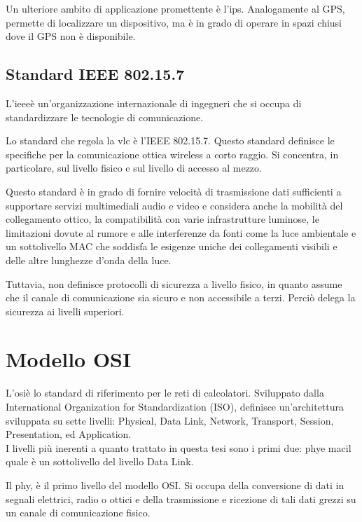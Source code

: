 Un ulteriore ambito di applicazione promettente è l'\gls{ips}\glsfirstoccur. Analogamente al GPS, permette di localizzare un dispositivo, ma è in grado di operare in spazi chiusi dove il GPS non è disponibile.

\subsection{Standard IEEE 802.15.7}
L'\gls{ieee}\glsfirstoccur è un'organizzazione internazionale di ingegneri che si occupa di standardizzare le tecnologie di comunicazione.

Lo standard che regola la \gls{vlc} è l'IEEE 802.15.7. Questo standard definisce le specifiche per la comunicazione ottica wireless a corto raggio. Si concentra, in particolare, sul livello fisico e sul livello di accesso al mezzo.

Questo standard è in grado di fornire velocità di trasmissione dati sufficienti a supportare servizi multimediali audio e video e considera anche la mobilità del collegamento ottico, la compatibilità con varie infrastrutture luminose, le limitazioni dovute al rumore e alle interferenze da fonti come la luce ambientale e un sottolivello MAC che soddisfa le esigenze uniche dei collegamenti visibili e delle altre lunghezze d'onda della luce.

Tuttavia, non definisce protocolli di sicurezza a livello fisico, in quanto assume che il canale di comunicazione sia sicuro e non accessibile a terzi. Perciò delega la sicurezza ai livelli superiori.

\section{Modello OSI}

L'\gls{osi}\glsfirstoccur è lo standard di riferimento per le reti di calcolatori. Sviluppato dalla International Organization for Standardization (ISO), definisce un'architettura sviluppata su sette livelli: Physical, Data Link, Network, Transport, Session, Presentation, ed Application.\\
I livelli più inerenti a quanto trattato in questa tesi sono i primi due: \gls{phy}\glsfirstoccur e \gls{mac}\glsfirstoccur il quale è un sottolivello del livello Data Link.

Il \gls{phy}, è il primo livello del modello OSI. Si occupa della conversione di dati in segnali elettrici, radio o ottici e della trasmissione e ricezione di tali dati grezzi su un canale di comunicazione fisico.

